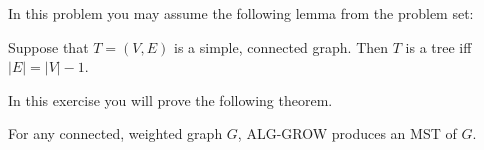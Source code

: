 \documentclass[12pt]{article}
\begin{document}
In this problem you may assume the following lemma from 
the problem set:
\begin{lemma}\label{n1}
Suppose that $T = (V, E)$ is a simple, connected graph. Then $T$ is a
tree iff $|E| = |V|-1$.
\end{lemma}

\instatements{\vspace{.2in}}

In this exercise you will prove the following theorem.

\begin{theorem*}
For any connected, weighted graph $G$, ALG-GROW produces an MST of $G$. 
\end{theorem*}

\instatements{\vspace{.2in}}
\end{document}
